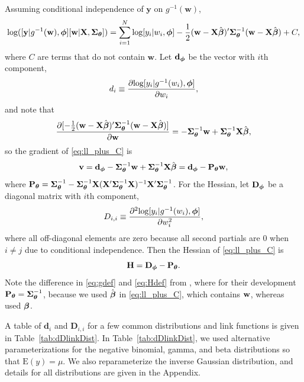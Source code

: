 \documentclass[12pt, titlepage]{article}
\begin{document}
Assuming conditional independence of $\mathbf{y}$ on $g^{-1}(\mathbf{w})$,
\begin{equation} \label{eq:ll_plus_C}
\textrm{log}([\mathbf{y}|g^{-1}(\mathbf{w}),\boldsymbol{\phi}][\mathbf{w}|\mathbf{X},\mbox{\boldmath $\Sigma$}_{\boldsymbol{\theta}}]) = \sum_{i = 1}^N \textrm{log}[y_i|w_i,\boldsymbol{\phi}] - \frac{1}{2}(\mathbf{w} - \mathbf{X}\hat{\boldsymbol{\beta}})^{\prime}\mbox{\boldmath $\Sigma$}_{\boldsymbol{\theta}}^{-1}(\mathbf{w} - \mathbf{X}\hat{\boldsymbol{\beta}}) + C,
\end{equation}
where $C$ are terms that do not contain $\mathbf{w}$. Let $\mathbf{d}_{\boldsymbol{\phi}}$ be the vector with $i$th component,
$$
d_{i} \equiv \frac{\partial\textrm{log}[y_i|g^{-1}(w_i),\boldsymbol{\phi}]}{\partial w_i},
$$
and note that
$$
\frac{\partial [-\frac{1}{2}(\mathbf{w} - \mathbf{X}\hat{\boldsymbol{\beta}})^{\prime}\mbox{\boldmath $\Sigma$}_{\boldsymbol{\theta}}^{-1}(\mathbf{w} - \mathbf{X}\hat{\boldsymbol{\beta}})]}{\partial \mathbf{w}} = -\mbox{\boldmath $\Sigma$}_{\boldsymbol{\theta}}^{-1}\mathbf{w} + \mbox{\boldmath $\Sigma$}_{\boldsymbol{\theta}}^{-1}\mathbf{X}\hat{\boldsymbol{\beta}},
$$
so the gradient of \eqref{eq:ll_plus_C} is
\begin{equation} \label{eq:gdef}
\mathbf{v} = \mathbf{d}_{\boldsymbol{\phi}} - \mbox{\boldmath $\Sigma$}_{\boldsymbol{\theta}}^{-1}\mathbf{w} + \mbox{\boldmath $\Sigma$}_{\boldsymbol{\theta}}^{-1}\mathbf{X}\hat{\boldsymbol{\beta}} = \mathbf{d}_{\boldsymbol{\phi}} - \mathbf{P}_{\boldsymbol{\theta}}\mathbf{w},
\end{equation}
where $\mathbf{P}_{\boldsymbol{\theta}} = \mbox{\boldmath $\Sigma$}_{\boldsymbol{\theta}}^{-1} - \mbox{\boldmath $\Sigma$}_{\boldsymbol{\theta}}^{-1}\mathbf{X}(\mathbf{X}^{\prime}\mbox{\boldmath $\Sigma$}_{\boldsymbol{\theta}}^{-1}\mathbf{X})^{-1}\mathbf{X}^{\prime}\mbox{\boldmath $\Sigma$}_{\boldsymbol{\theta}}^{-1}$. For the Hessian, let $\mathbf{D}_{\boldsymbol{\phi}}$ be a diagonal matrix with $i$th component,
\begin{equation} \label{eq:Dii}
D_{i,i} \equiv \frac{\partial^2\textrm{log}[y_i|g^{-1}(w_i),\boldsymbol{\phi}]}{\partial w_i^2},
\end{equation}
where all off-diagonal elements are zero because all second partials are 0 when $i \neq j$ due to conditional independence.  Then the Hessian of \eqref{eq:ll_plus_C} is
\begin{equation} \label{eq:Hdef}
\mathbf{H} = \mathbf{D}_{\boldsymbol{\phi}} -\mathbf{P}_{\boldsymbol{\theta}}.
\end{equation}
Note the difference in \eqref{eq:gdef} and \eqref{eq:Hdef} from \citet{ bonat_practical_2016}, where for their development $\mathbf{P}_{\boldsymbol{\theta}} = \mbox{\boldmath $\Sigma$}_{\boldsymbol{\theta}}^{-1}$, because we used $\hat{\boldsymbol{\beta}}$ in \eqref{eq:ll_plus_C}, which contains $\mathbf{w}$, whereas \citet{ bonat_practical_2016} used $\boldsymbol{\beta}$.

A table of $\mathbf{d}_{i}$ and $\mathbf{D}_{i,i}$ for a few common distributions and link functions is given in Table~\ref{tab:dDlinkDist}.  In Table~\ref{tab:dDlinkDist}, we used alternative parameterizations for the negative binomial, gamma, and beta distributions so that $\textrm{E}(y) = \mu$.  We also reparameterize the inverse Gaussian distribution, and details for all distributions are given in the Appendix.
\end{document}
